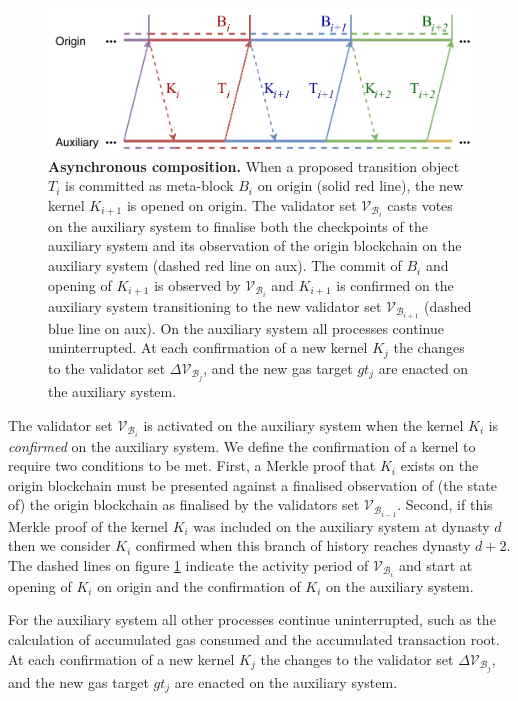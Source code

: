 \documentclass[12pt,a4paper]{article}
\begin{document}
\begin{figure}[tb]
    \centering
	\includegraphics[width=\textwidth]{transition}
	\caption{\textbf{Asynchronous composition.}
		When a proposed transition object $T_i$ is committed as meta-block $B_i$ on origin (solid red line), the new kernel $K_{i+1}$ is opened on origin.
		The validator set $\mathcal{V}_{\mathcal{B}_i}$ casts votes on the auxiliary system to finalise both the checkpoints of the auxiliary system and its observation of the origin blockchain on the auxiliary system (dashed red line on aux).
		The commit of $B_i$ and opening of $K_{i+1}$ is observed by $\mathcal{V}_{\mathcal{B}_i}$ and $K_{i+1}$ is confirmed on the auxiliary system transitioning to the new validator set $\mathcal{V}_{\mathcal{B}_{i+1}}$ (dashed blue line on aux).
		On the auxiliary system all processes continue uninterrupted.
		At each confirmation of a new kernel $K_j$ the changes to the validator set $\Delta\mathcal{V}_{\mathcal{B}_j}$, and the new gas target $gt_j$ are enacted on the auxiliary system.
	}
	\label{fig:asynccomp}
\end{figure}

The validator set $\mathcal{V}_{\mathcal{B}_i}$ is activated on the auxiliary system when the kernel $K_i$ is \emph{confirmed} on the auxiliary system.
We define the confirmation of a kernel to require two conditions to be met.
First, a Merkle proof that $K_i$ exists on the origin blockchain must be presented against a finalised observation of (the state of) the origin blockchain as finalised by the validators set $\mathcal{V}_{\mathcal{B}_{i-1}}$.
Second, if this Merkle proof of the kernel $K_i$ was included on the auxiliary system at dynasty $d$ then we consider $K_i$ confirmed when this branch of history reaches dynasty $d+2$. The dashed lines on figure \ref{fig:asynccomp} indicate the activity period of $\mathcal{V}_{\mathcal{B}_i}$ and start at opening of $K_i$ on origin and the confirmation of $K_i$ on the auxiliary system.

For the auxiliary system all other processes continue uninterrupted, such as the calculation of accumulated gas consumed and the accumulated transaction root.
At each confirmation of a new kernel $K_j$ the changes to the validator set $\Delta\mathcal{V}_{\mathcal{B}_j}$, and the new gas target $gt_j$ are enacted on the auxiliary system.
\end{document}
